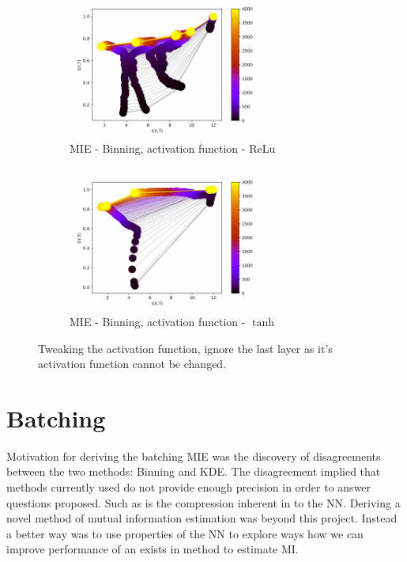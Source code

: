 \documentclass[dissertation.tex]{subfiles}
\begin{document}
\begin{figure}[ht]
  \centering
  \begin{subfigure}[t]{0.49\textwidth}
    \centering
    \includegraphics[width=0.7\textwidth]{figs/eval/activationFunction/BinningRelu.jpg}
    \caption{
      MIE - Binning, activation function - ReLu
    }
    \label{figReluTanhRelu}
  \end{subfigure}
  \begin{subfigure}[t]{0.49\textwidth}
    \centering
    \includegraphics[width=0.7\textwidth]{figs/eval/activationFunction/BinningTanh.jpg}
    \caption{
      MIE - Binning, activation function - $\tanh$
    }
    \label{figReluTanhTanh}
  \end{subfigure}
  \caption{
      Tweaking the activation function, ignore the last layer as it's
      activation function cannot be changed.
    }
  \label{figReluTanh}
\end{figure}

\section{Batching} \label{subEvalBatching}

Motivation for deriving the batching MIE was the discovery of disagreements
between the two methods: Binning and KDE. The disagreement implied that methods
currently used do not provide enough precision in order to answer questions
proposed. Such as is the compression inherent in to the NN.  Deriving a novel
method of mutual information estimation was beyond this project. Instead a
better way was to use properties of the NN to explore ways how we can improve
performance of an exists in method to estimate MI. 
\end{document}
